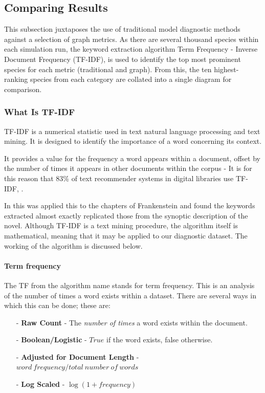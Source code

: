 \subsection{Comparing Results}
This subsection juxtaposes the use of traditional model diagnostic methods against a selection of graph metrics. As there are several thousand species within each simulation run, the keyword extraction algorithm Term Frequency - Inverse Document Frequency (TF-IDF), is used to identify the top most prominent species for each metric (traditional and graph). From this, the ten highest-ranking species from each category are collated into a single diagram for comparison.


\subsubsection{What Is TF-IDF}
TF-IDF is a numerical statistic used in text natural language processing and text mining. It is designed to identify the importance of a word concerning its context.

It provides a value for the frequency a word appears within a document, offset by the number of times it appears in other documents within the corpus - It is for this reason that 83\% of text recommender systems in digital libraries use TF-IDF, \citep{tf83}.

 In \citep{frankenstein} this was applied this to the chapters of Frankenstein and found the keywords extracted almost exactly replicated those from the synoptic description of the novel. Although TF-IDF is a text mining procedure, the algorithm itself is mathematical, meaning that it may be applied to our diagnostic dataset. The working of the algorithm is discussed below.

\paragraph*{Term frequency}
The TF from the algorithm name stands for term frequency. This is an analysis of the number of times a word exists within a dataset. There are several ways in which this can be done; these are:

\begin{itemize}
    \item[-] \textbf{Raw Count} - The \textit{number of times} a word exists within the document.
    \item[-] \textbf{Boolean/Logistic} - $True$ if the word exists, false otherwise.
    \item[-] \textbf{Adjusted for Document Length} -  $word\ frequency / total\ number\ of\ words$
    \item[-] \textbf{Log Scaled} - $\log(1+frequency)$
\end{itemize}

